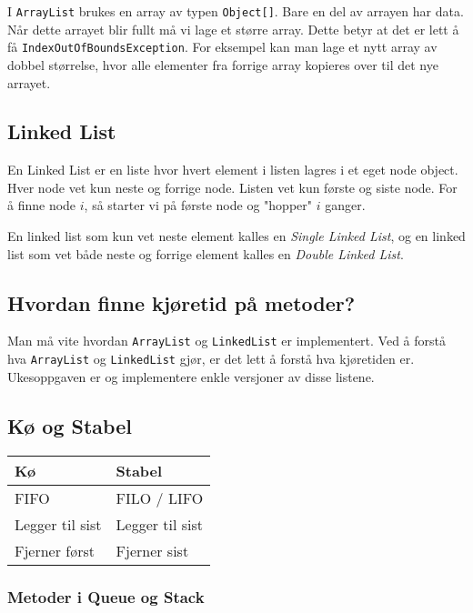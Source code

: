 \documentclass[twocolumn]{article}
\begin{document}
I \verb!ArrayList! brukes en array av typen \verb!Object[]!. Bare en del av arrayen har data. Når dette arrayet blir fullt må vi lage et større array. Dette betyr at det er lett å få \verb!IndexOutOfBoundsException!. For eksempel kan man lage et nytt array av dobbel størrelse, hvor alle elementer fra forrige array kopieres over til det nye arrayet.

\subsection{Linked List}

En Linked List er en liste hvor hvert element i listen lagres i et eget node object. Hver node vet kun neste og forrige node. Listen vet kun første og siste node. For å finne node \( i \), så starter vi på første node og "hopper" \( i \) ganger.
\bigskip

En linked list som kun vet neste element kalles en \textit{Single Linked List}, og en linked list som vet både neste og forrige element kalles en \textit{Double Linked List}.

\subsection{Hvordan finne kjøretid på metoder?}

Man må vite hvordan \verb!ArrayList! og \verb!LinkedList! er implementert. Ved å forstå hva \verb!ArrayList! og \verb!LinkedList! gjør, er det lett å forstå hva kjøretiden er. Ukesoppgaven er og implementere enkle versjoner av disse listene.

\subsection{Kø og Stabel}

\begin{table}[H]
        \begin{tabular}[c]{|l|l|}
            \hline
            Kø & Stabel  \\
            \hline
             FIFO& FILO / LIFO  \\
             Legger til sist& Legger til sist  \\
             Fjerner først& Fjerner sist   \\
            \hline
        \end{tabular}
\end{table}

\subsubsection{Metoder i Queue og Stack}
\end{document}
